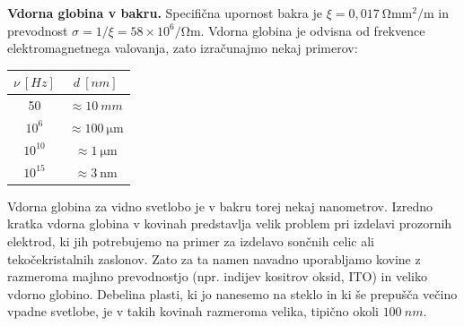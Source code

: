\begin{example}{\bf Vdorna globina v bakru.}
Specifična upornost bakra je $\xi = 0,017~\si{\ohm \milli\metre^2/\metre}$ in 
prevodnost $\sigma = 1/\xi = 58 \times 10^6/\si{\ohm\metre}$. 
Vdorna globina je odvisna od frekvence elektro\-mag\-net\-nega valovanja, 
zato izračunajmo nekaj primerov: 
\begin{center}
\begin{tabular}{|c|c|}
\hline
$\nu~[\si{Hz}]$ & $d~[\si{nm}]$\\ \hline
50 & $\approx 10~\si{mm}$\\ \hline
$10^6$ & $\approx 100~\si{\micro\metre}$\\ \hline
$10^{10}$ & $\approx 1~\si{\micro\metre}$\\ \hline
$10^{15}$ & $\approx 3~\si{\nano\metre}$\\ \hline
\end{tabular}
\end{center}

Vdorna globina za vidno svetlobo je v bakru torej nekaj nanometrov. 
Izredno kratka vdorna globina v kovinah predstavlja velik problem pri izdelavi prozornih elektrod, 
ki jih potrebujemo na primer za izdelavo sončnih celic
ali tekočekristalnih zaslonov. Zato za ta namen navadno uporabljamo
kovine z razmeroma majhno prevodnostjo (npr. indijev 
kositrov oksid, ITO) in veliko vdorno globino. Debelina plasti, ki
jo nanesemo na steklo in ki še prepušča večino vpadne svetlobe, je 
v takih kovinah razmeroma velika, tipično 
okoli $100~\si{nm}$. 
\end{example}
